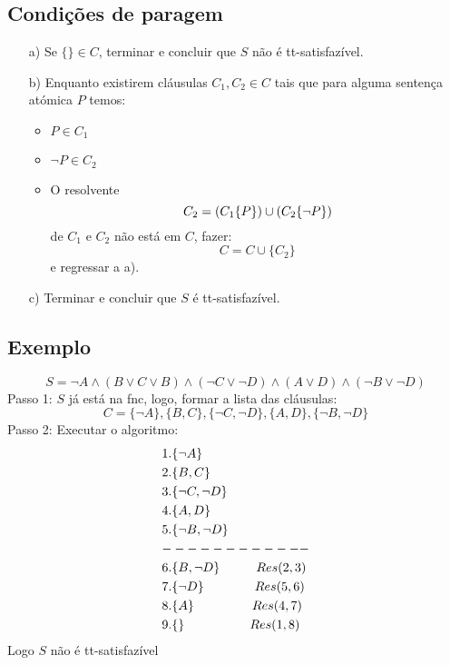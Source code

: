 \documentclass[10pt,a4paper]{report}
\begin{document}
\subsection{Condições de paragem}
\begin{itemize}
\item[a)] Se $\{\} \in C$, terminar e concluir que $S$ não é tt-satisfazível.
\item[b)] Enquanto existirem cláusulas $C_1, C_2 \in C$ tais que para alguma sentença
atómica $P$ temos:
\begin{itemize}
\item $P \in C_1$
\item $\neg P \in C_2$
\item O resolvente 
$$
C_2 = (C_1\\\{P\}) \cup (C_2\\\{\neg P\})
$$
de $C_1$ e $C_2$ não está em $C$, fazer:
$$
C = C \cup \{C_2\}
$$
e regressar a a).
\end{itemize}
\item[c)] Terminar e concluir que $S$ é tt-satisfazível.
\end{itemize}
\subsection{Exemplo}
$$
S = \neg A \land (B \lor C \lor B) \land (\neg C \lor \neg D) \land (A \lor D) \land (\neg B \lor \neg D)
$$
Passo 1: $S$ já está na fnc, logo, formar a lista das cláusulas:
$$
C = \{\neg A\}, \{B, C\}, \{\neg C, \neg D\}, \{A, D\}, \{\neg B, \neg D\}
$$
Passo 2: Executar o algoritmo:
\begin{align}
1.& \{\neg A\}\\
2.& \{B, C\}\\
3.& \{\neg C, \neg D\}\\
4.& \{A, D\}\\
5.& \{\neg B, \neg D\}\\
-&-----------\\
6.& \{B, \neg D\} \hspace{1cm} Res(2, 3)\\
7.& \{\neg D\} \hspace{1.4cm} Res(5, 6)\\
8.& \{A\} \hspace{1.6cm} Res(4, 7)\\
9.& \{ \} \hspace{1.8cm} Res(1, 8)
\end{align}
Logo $S$ não é tt-satisfazível
\end{document}
